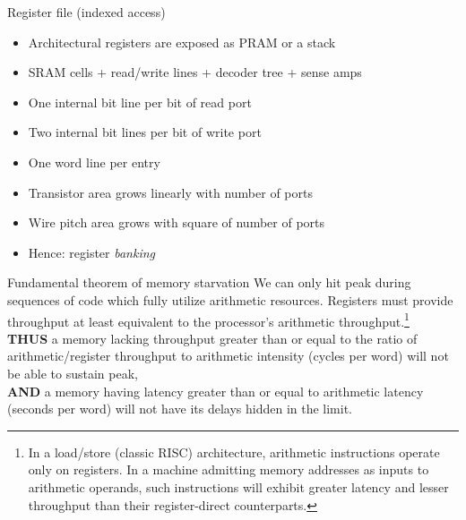 \documentclass[xcolor={dvipsnames,table}]{beamer}
\begin{document}
\begin{frame}{Register file (indexed access)}
\begin{itemize}
\item Architectural registers are exposed as PRAM or a stack
\item SRAM cells + read/write lines + decoder tree + sense amps
\item One internal bit line per bit of read port
\item Two internal bit lines per bit of write port
\item One word line per entry
\item Transistor area grows linearly with number of ports
\item Wire pitch area grows with square of number of ports
\item Hence: register \textit{banking}
\end{itemize}
\end{frame}

\begin{frame}{Fundamental theorem of memory starvation}
We can only hit peak during sequences of code which fully
utilize arithmetic resources. Registers must provide throughput
at least equivalent to the processor's arithmetic throughput.\footnote{\tiny{In a load/store (classic RISC) architecture, arithmetic instructions operate
only on registers. In a machine admitting memory addresses as inputs to
arithmetic operands, such instructions will exhibit greater latency and lesser throughput
than their register-direct counterparts.}}\\
\vspace{.25in}
\textbf{THUS} a memory lacking throughput greater than or equal to the ratio of
arithmetic/register throughput to arithmetic intensity (cycles per word) will not be able
to sustain peak,\\
\vspace{.15in}
\textbf{AND} a memory having latency greater than or equal to arithmetic latency
(seconds per word) will not have its delays hidden in the limit.
\end{frame}
\end{document}
